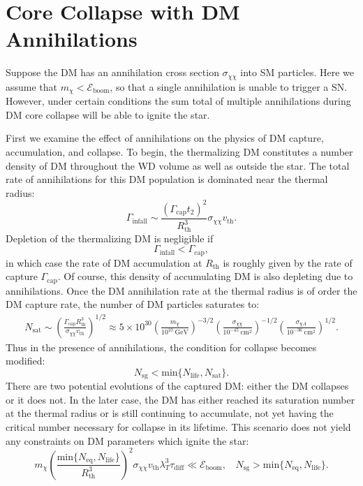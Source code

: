 \documentclass[preprintnumbers,amsmath,amssymb,prd,superscriptaddress]{revtex4}
\newcommand{\Eboom}{\mathcal{E}_\text{boom}}
\newcommand{\GeV}{\text{GeV}}
\newcommand{\cm}{\text{cm}}
\def\r{\right)}
\def\l{\left(}
\begin{document}
\section{Core Collapse with DM Annihilations}

Suppose the DM has an annihilation cross section $\sigma_{\chi \chi}$ into SM particles.
Here we assume that $m_\chi < \Eboom$, so that a single annihilation is unable to trigger a SN. 
However, under certain conditions the sum total of multiple annihilations during DM core collapse will be able to ignite the star. 

First we examine the effect of annihilations on the physics of DM capture, accumulation, and collapse. 
To begin, the thermalizing DM constitutes a number density of DM throughout the WD volume as well as outside the star. 
The total rate of annihilations for this DM population is dominated near the thermal radius:
\begin{equation}
\Gamma_\text{infall} \sim \frac{(\Gamma_\text{cap} t_2)^2}{R_\text{th}^3} \sigma_{\chi \chi} v_\text{th}. 
\end{equation}
Depletion of the thermalizing DM is negligible if
\begin{equation}
\label{eq:steadycollect}
\Gamma_\text{infall} < \Gamma_\text{cap},
\end{equation}
in which case the rate of DM accumulation at $R_\text{th}$ is roughly given by the rate of capture $\Gamma_\text{cap}$. 
Of course, this density of accumulating DM is also depleting due to annihilations. 
Once the DM annihilation rate at the thermal radius is of order the DM capture rate, the number of DM particles saturates to:
\begin{align}
N_\text{sat} \sim \l \frac{\Gamma_\text{cap} R_\text{th}^3}{\sigma_{\chi \chi} v_\text{th}} \r^{1/2} \approx 5 \times 10^{30} \l \frac{m_\chi}{10^{10} ~\GeV} \r^{-3/2} \l \frac{\sigma_{\chi \chi}}{10^{-45} ~\cm^2} \r^{-1/2}  \l \frac{\sigma_{\chi A}}{10^{-36} ~\cm^2} \r^{1/2}.
\end{align}
Thus in the presence of annihilations, the condition for collapse becomes modified:
\begin{equation}
\label{eq:collapsecond}
N_\text{sg} < \text{min}\{N_\text{life}, N_\text{sat}\}.
\end{equation}
There are two potential evolutions of the captured DM: either the DM collapses or it does not. 
In the later case, the DM has either reached its saturation number at the thermal radius or is still continuing to accumulate, not yet having the critical number necessary for collapse in its lifetime.
This scenario does not yield any constraints on DM parameters which ignite the star:
\begin{equation}
\label{eq:nocollapse}
m_\chi \l \frac{\text{min}\{N_\text{eq}, N_\text{life}\}}{R_\text{th}^3}\r^2 \sigma_{\chi \chi} v_\text{th} \lambda_T^3 \tau_\text{diff} \ll \Eboom, ~~~~ N_\text{sg}>\text{min}\{N_\text{eq}, N_\text{life}\}.
\end{equation}
\end{document}
